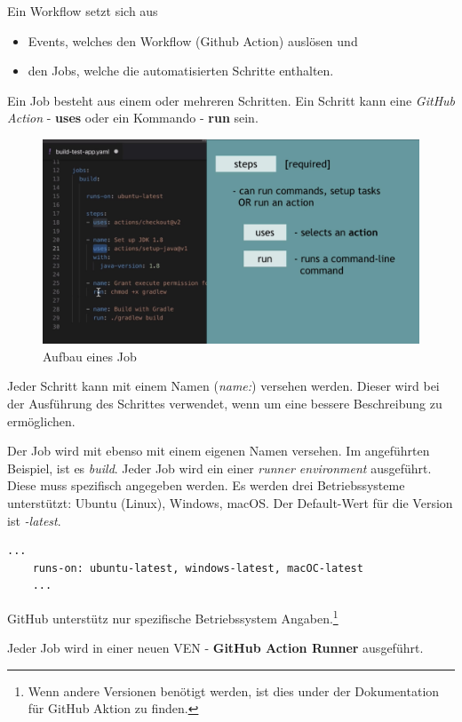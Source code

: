 Ein Workflow setzt sich aus
\begin{itemize}
	\item Events, welches den Workflow (Github Action) auslösen und
	\item den Jobs, welche die automatisierten Schritte enthalten.
\end{itemize}
Ein Job besteht aus einem oder mehreren Schritten. Ein Schritt kann eine \textit{GitHub Action} - \textbf{uses} oder ein Kommando - \textbf{run} sein.

\begin{figure}[H]
	\centering
	\includegraphics[scale = 0.2]{attachment/chapter_2/Scc100}
	\caption{Aufbau eines Job}
\end{figure}

Jeder Schritt kann mit einem Namen (\textit{name:}) versehen werden. Dieser wird bei der Ausführung des Schrittes verwendet, wenn um eine bessere Beschreibung zu ermöglichen.

Der Job wird mit ebenso mit einem eigenen Namen versehen. Im angeführten Beispiel, ist es \textit{build}. Jeder Job wird ein einer \textit{runner environment} ausgeführt. Diese muss spezifisch angegeben werden. Es werden drei Betriebssysteme unterstützt: Ubuntu (Linux), Windows, macOS. Der Default-Wert für die Version ist \textit{-latest}.

\begin{lstlisting}[style=Config, caption={GitHub Runner}, captionpos=b]
	...
	runs-on: ubuntu-latest, windows-latest, macOC-latest
	...
\end{lstlisting}

GitHub unterstütz nur spezifische Betriebssystem Angaben.\footnote{
	Wenn andere Versionen benötigt werden, ist dies under der Dokumentation für GitHub Aktion zu finden.
}	

Jeder Job wird in einer neuen \gls{VEN} - \textbf{GitHub Action Runner} ausgeführt.


